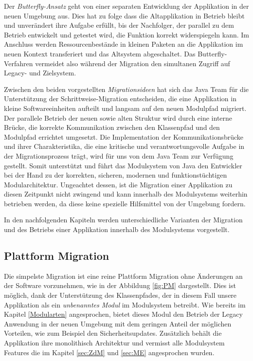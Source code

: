 	Der \textit{Butterfly-Ansatz} geht von einer separaten Entwicklung der Applikation in der neuen Umgebung aus. Dies hat zu folge dass die Altapplikation in Betrieb bleibt und unverändert ihre Aufgabe erfüllt, bis der Nachfolger, der parallel zu dem Betrieb entwickelt und getestet wird, die Funktion korrekt widerspiegeln kann. Im Anschluss werden Ressourcenbestände in kleinen Paketen an die Applikation im neuen Kontext transferiert und das Altsystem abgeschaltet. Das Butterfly-Verfahren vermeidet also während der Migration den simultanen Zugriff auf Legacy- und Zielsystem. \cite{sneed2016softwaremigration} \bigbreak

	Zwischen den beiden vorgestellten \textit{Migrationsideen} hat sich das Java Team für die Unterstützung der Schrittweise-Migration entscheiden, die eine Applikation in kleine Softwareeinheiten aufteilt und langsam auf den neuen Modulpfad migriert. Der parallele Betrieb der neuen sowie alten Struktur wird durch eine interne Brücke, die korrekte Kommunikation zwischen den Klassenpfad und den Modulpfad errichtet umgesetzt. Die Implementation der Kommunikationsbrücke und ihrer Charakteristika, die eine kritische und verantwortungsvolle Aufgabe in der Migrationsprozess trägt, wird für uns von dem Java Team zur Verfügung gestellt. Somit unterstützt und führt das Modulsystem von Java den Entwickler bei der Hand zu der korrekten, sicheren, modernen und funktionstüchtigen Modularchitektur. \newline
	Ungeachtet dessen, ist die Migration einer Applikation zu diesen Zeitpunkt nicht zwingend und kann innerhalb des Modulsystems weiterhin betrieben werden, da diese keine spezielle Hilfsmittel von der Umgebung fordern.\bigbreak

	In den nachfolgenden Kapiteln werden unterschiedliche Varianten der Migration und des Betriebs einer Applikation innerhalb des Modulsystems vorgestellt. 


\subsection{Plattform Migration}
	Die simpelste Migration ist eine reine Plattform Migration ohne Änderungen an der Software vorzunehmen, wie in der Abbildung \ref{fig:PM} dargestellt. Dies ist möglich, dank der Unterstützung des Klassenpfades, der in diesem Fall unsere Applikation als ein \textit{unbenanntes Modul} im Modulsystem betreibt. Wie bereits im Kapitel \ref{Modularten} angesprochen, bietet dieses Modul den Betrieb der Legacy Anwendung in der neuen Umgebung mit dem geringen Anteil der möglichen Vorteilen, wie zum Beispiel den Sicherheitsupdates. Zusätzlich behält die Applikation ihre monolithisch Architektur und vermisst alle Modulsystem Features die im Kapitel \ref{sec:ZdM} und \ref{sec:ME} angesprochen wurden.

